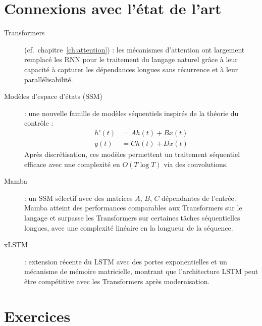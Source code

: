 \section{Connexions avec l'\'etat de l'art}
\label{sec:rnn-sota}

\begin{sota}[title=\textbf{Au-del\`a des RNN classiques}]
\begin{description}
  \item[Transformers] (cf.\ chapitre~\ref{ch:attention}) : les m\'ecanismes
    d'attention ont largement remplac\'e les RNN pour le traitement du langage
    naturel gr\^ace \`a leur capacit\'e \`a capturer les d\'ependances longues
    sans r\'ecurrence et \`a leur parall\'elisabilit\'e.

  \item[Mod\`eles d'espace d'\'etats (SSM)] : une nouvelle famille de mod\`eles
    s\'equentiels inspir\'es de la th\'eorie du contr\^ole :
    \begin{align}
      h'(t) &= A h(t) + B x(t) \\
      y(t) &= C h(t) + D x(t)
    \end{align}
    Apr\`es discr\'etisation, ces mod\`eles permettent un traitement s\'equentiel
    efficace avec une complexit\'e en $O(T \log T)$ via des convolutions.

  \item[Mamba] \cite{gu2024mamba} : un SSM s\'electif avec des matrices $A$, $B$,
    $C$ d\'ependantes de l'entr\'ee. Mamba atteint des performances
    comparables aux Transformers sur le langage et surpasse les Transformers
    sur certaines t\^aches s\'equentielles longues, avec une complexit\'e
    lin\'eaire en la longueur de la s\'equence.

  \item[xLSTM] \cite{beck2024xlstm} : extension r\'ecente du LSTM avec des
    portes exponentielles et un m\'ecanisme de m\'emoire matricielle,
    montrant que l'architecture LSTM peut \^etre comp\'etitive avec les
    Transformers apr\`es modernisation.
\end{description}
\end{sota}

\section{Exercices}
\label{sec:rnn-exercices}


